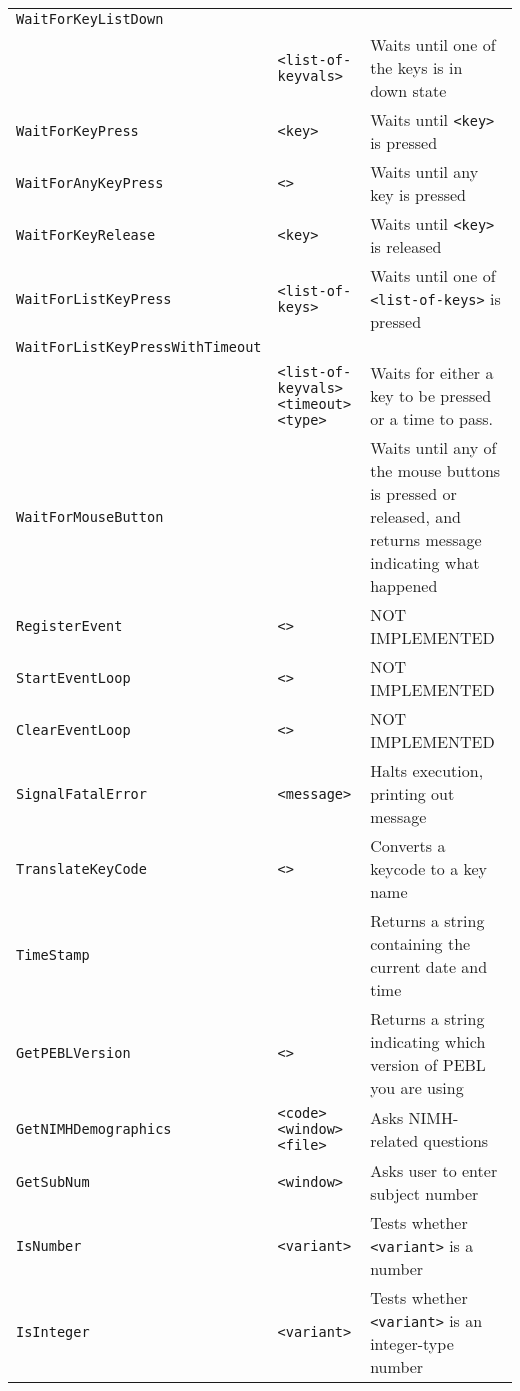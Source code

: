 \begin{longtable}{p{3cm}p{3cm}p{6cm}}
\verb+WaitForKeyListDown+ & & \\ 
& \verb+<list-of-keyvals>+ & Waits until one of the keys is in down state\\ 
\verb+WaitForKeyPress+ &\verb+<key>+ &Waits until \verb+<key>+ is pressed\\ 
\verb+WaitForAnyKeyPress+ &\hspace{0.5cm} \verb+<>+ &Waits until any key is pressed\\ 
\verb+WaitForKeyRelease+ &\hspace{0.5cm} \verb+<key>+ & Waits until \verb+<key>+ is released\\ 
\verb+WaitForListKeyPress+ &\hspace{0.5cm}\verb+<list-of-keys>+ &Waits until one of \verb+<list-of-keys>+ is pressed \\ 
\verb+WaitForListKeyPressWithTimeout+&\\
&\verb+<list-of-keyvals>+ \verb+<timeout>+ \verb+<type>+ & Waits for either a key to be pressed or a time to pass.\\
\verb+WaitForMouseButton+ & &Waits until any of the mouse buttons is pressed or released, and returns message indicating what happened \\ 
\verb+RegisterEvent+ &\verb+<>+ & NOT IMPLEMENTED\\ 
\verb+StartEventLoop+ &\verb+<>+ & NOT IMPLEMENTED\\ 
\verb+ClearEventLoop+ &\verb+<>+ & NOT IMPLEMENTED\\ 
\verb+SignalFatalError+ &\verb+<message>+ & Halts execution, printing out message \\ 
\verb+TranslateKeyCode+ &\verb+<>+ &Converts a keycode to a key name\\ 
\verb+TimeStamp+ & &Returns a string containing the current date and time\\ 
\verb+GetPEBLVersion+ &\verb+<>+ &Returns a string indicating which version of PEBL you are using\\ 
\verb+GetNIMHDemographics+ & \hspace{0.7cm}\verb+<code>+ \verb+<window>+ \verb+<file>+ & Asks NIMH-related questions\\ 
\verb+GetSubNum+ & \verb+<window>+ & Asks user to enter subject number\\
\verb+IsNumber+ & \verb+<variant>+ & Tests whether \verb+<variant>+ is a number \\ 
\verb+IsInteger+ & \verb+<variant>+ & Tests whether \verb+<variant>+ is an integer-type number\\ 

\end{longtable}
